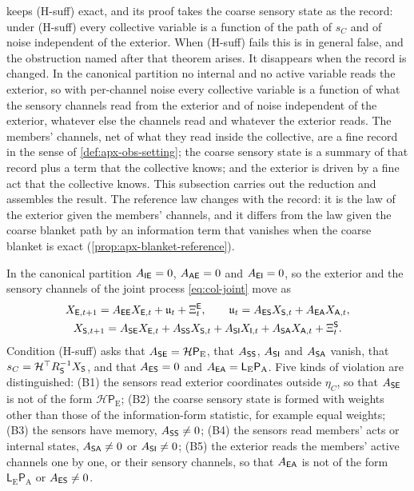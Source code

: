  keeps (H-suff) exact, and its proof takes the coarse sensory state as the record: under (H-suff) every collective variable is a function of the path of $s_C$ and of noise independent of the exterior. When (H-suff) fails this is in general false, and the obstruction named after that theorem arises. It disappears when the record is changed. In the canonical partition no internal and no active variable reads the exterior, so with per-channel noise every collective variable is a function of what the sensory channels read from the exterior and of noise independent of the exterior, whatever else the channels read and whatever the exterior reads. The members' channels, net of what they read inside the collective, are a fine record in the sense of \cref{def:apx-obs-setting}; the coarse sensory state is a summary of that record plus a term that the collective knows; and the exterior is driven by a fine act that the collective knows. This subsection carries out the reduction and assembles the result. The reference law changes with the record: it is the law of the exterior given the members' channels, and it differs from the law given the coarse blanket path by an information term that vanishes when the coarse blanket is exact (\cref{prop:apx-blanket-reference}).

In the canonical partition $A_{\mathsf{I}\mathsf{E}}=0$, $A_{\mathsf{A}\mathsf{E}}=0$ and $A_{\mathsf{E}\mathsf{I}}=0$, so the exterior and the sensory channels of the joint process \eqref{eq:col-joint} move as
\begin{equation}\label{eq:apx-blanket-rows}
\begin{gathered}
X_{\mathsf{E},t+1}=A_{\mathsf{E}\mathsf{E}}X_{\mathsf{E},t}+\mathfrak u_t+\Xi^{\mathsf{E}}_t,\qquad\mathfrak u_t=A_{\mathsf{E}\mathsf{S}}X_{\mathsf{S},t}+A_{\mathsf{E}\mathsf{A}}X_{\mathsf{A},t},\\
X_{\mathsf{S},t+1}=A_{\mathsf{S}\mathsf{E}}X_{\mathsf{E},t}+A_{\mathsf{S}\mathsf{S}}X_{\mathsf{S},t}+A_{\mathsf{S}\mathsf{I}}X_{\mathsf{I},t}+A_{\mathsf{S}\mathsf{A}}X_{\mathsf{A},t}+\Xi^{\mathsf{S}}_t .
\end{gathered}
\end{equation}
Condition (H-suff) asks that $A_{\mathsf{S}\mathsf{E}}=\mathcal H\mathsf P_{\mathrm E}$, that $A_{\mathsf{S}\mathsf{S}}$, $A_{\mathsf{S}\mathsf{I}}$ and $A_{\mathsf{S}\mathsf{A}}$ vanish, that $s_C=\mathcal H^\top R_{\mathsf{S}}^{-1}X_{\mathsf{S}}$, and that $A_{\mathsf{E}\mathsf{S}}=0$ and $A_{\mathsf{E}\mathsf{A}}=\mathsf L_{\mathrm E}\mathsf P_{\mathrm A}$. Five kinds of violation are distinguished: (B1) the sensors read exterior coordinates outside $\eta_C$, so that $A_{\mathsf{S}\mathsf{E}}$ is not of the form $\mathcal H\mathsf P_{\mathrm E}$; (B2) the coarse sensory state is formed with weights other than those of the information-form statistic, for example equal weights; (B3) the sensors have memory, $A_{\mathsf{S}\mathsf{S}}\ne0$; (B4) the sensors read members' acts or internal states, $A_{\mathsf{S}\mathsf{A}}\ne0$ or $A_{\mathsf{S}\mathsf{I}}\ne0$; (B5) the exterior reads the members' active channels one by one, or their sensory channels, so that $A_{\mathsf{E}\mathsf{A}}$ is not of the form $\mathsf L_{\mathrm E}\mathsf P_{\mathrm A}$ or $A_{\mathsf{E}\mathsf{S}}\ne0$.


